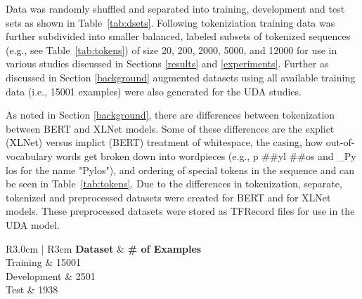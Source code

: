 \documentclass[twoside,twocolumn,10pt]{article}
\begin{document}
Data was randomly shuffled and separated into training, development and test sets as shown in Table~\ref{tab:dsets}. Following tokeniziation training data was further subdivided into smaller balanced, labeled subsets of tokenized sequences (e.g., see Table~\ref{tab:tokens}) of  size 20, 200, 2000, 5000, and 12000 for use in various studies discussed in Sections \ref{results} and \ref{experiments}. Further as discussed in Section \ref{background} augmented datasets using all available training data (i.e., 15001 examples) were also generated for the UDA studies.

As noted in Section \ref{background}, there are differences between tokenization between BERT and XLNet models. Some of these differences are the explict (XLNet) versus implict (BERT) treatment of whitespace, the casing, how out-of-vocabulary words get broken down into wordpieces (e.g., p \#\#yl \#\#os and \_Py los for the name "Pylos"), and ordering of special tokens in the sequence and can be seen in Table~\ref{tab:tokens}. Due to the differences in tokenization, separate, tokenized and preprocessed datasets were created for BERT and for XLNet models. These preprocessed datasets were stored as TFRecord files for use in the UDA model.

\begin{table}
	\caption{Division of Dataset}\label{tab:dsets}
	\centering
	\begin{tabular}{R{3.0cm} | R{3cm}}
		\toprule
		\textbf{Dataset} & \textbf{\# of Examples  }\\
		\midrule
		Training  & 15001  \\
		Development  & 2501   \\
		Test  & 1938   \\
		\bottomrule
	\end{tabular}
\end{table}
\end{document}
